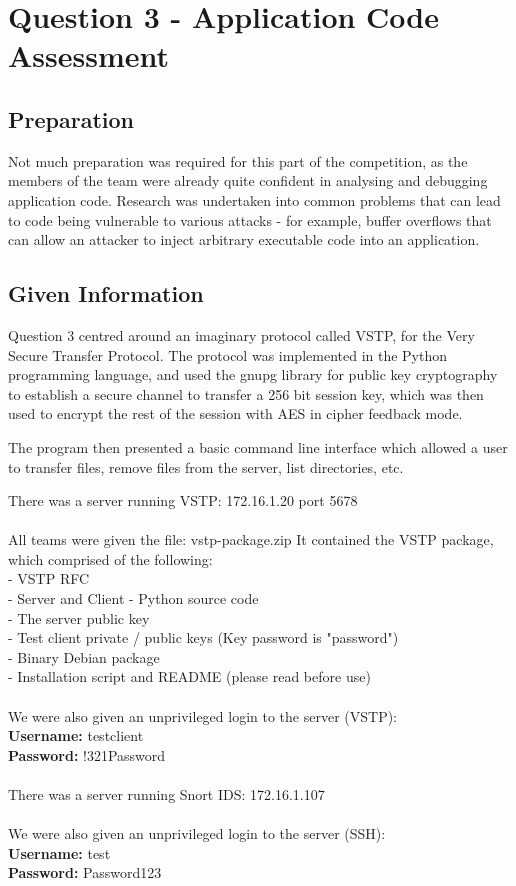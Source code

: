 \chapter{Question 3 - Application Code Assessment}

\section{Preparation}
Not much preparation was required for this part of the competition, as the
members of the team were already quite confident in analysing and debugging
application code. Research was undertaken into common problems that can lead to
code being vulnerable to various attacks - for example, buffer overflows that
can allow an attacker to inject arbitrary executable code into an application.

\section{Given Information}
Question 3 centred around an imaginary protocol called VSTP, for the Very 
Secure Transfer Protocol. The protocol was implemented in the Python 
programming language, and used the gnupg library for public key cryptography
to establish a secure channel to transfer a 256 bit session key, which was then
used to encrypt the rest of the session with AES in cipher feedback mode.

The program then presented a basic command line interface which allowed a user
to transfer files, remove files from the server, list directories, etc.

There was a server running VSTP: 172.16.1.20 port 5678
\\\\
All teams were given the file: vstp-package.zip
It contained the VSTP package, which comprised of the following:
\\- VSTP RFC
\\- Server and Client - Python source code
\\- The server public key
\\- Test client private / public keys (Key password is "password")
\\- Binary Debian package
\\- Installation script and README (please read before use)
\\\\
We were also given an unprivileged login to the server (VSTP):\\
\textbf{Username:} testclient
\\
\textbf{Password:} !321Password
\\\\
There was a server running Snort IDS: 172.16.1.107
\\\\
We were also given an unprivileged login to the server (SSH):\\
\textbf{Username:} test
\\
\textbf{Password:} Password123

